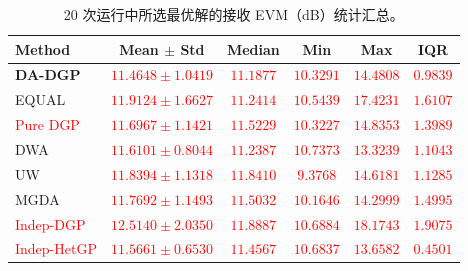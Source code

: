 \documentclass[11pt]{article}
\begin{document}
\begin{table}[!htbp]
	\centering
	\caption{Statistical summary of received EVM for the selected optimal solutions over 20 runs (dB).}
	\caption*{20 次运行中所选最优解的接收 EVM（dB）统计汇总。}
	\label{tab:evm_stats}
	\small
	\begin{tabular*}{\textwidth}{@{\extracolsep{\fill}}lccccc}
		\toprule
		\textbf{Method} & \textbf{Mean $\pm$ Std} & \textbf{Median} & \textbf{Min} & \textbf{Max} & \textbf{IQR} \\
		\midrule
		\textbf{DA-DGP}        & \textcolor{red}{$\mathbf{11.4648 \pm 1.0419}$}%
		                       & \textcolor{red}{$11.1877$} & \textcolor{red}{$10.3291$} & \textcolor{red}{$14.4808$} & \textcolor{red}{$0.9839$} \\
		EQUAL                  & \textcolor{red}{$11.9124 \pm 1.6627$}%
		                       & \textcolor{red}{$11.2414$} & \textcolor{red}{$10.5439$} & \textcolor{red}{$17.4231$} & \textcolor{red}{$1.6107$} \\
		\textcolor{red}{Pure DGP}%
		                       & \textcolor{red}{$11.6967 \pm 1.1421$}%
		                       & \textcolor{red}{$11.5229$} & \textcolor{red}{$10.3227$} & \textcolor{red}{$14.8353$} & \textcolor{red}{$1.3989$} \\
		DWA                    & \textcolor{red}{$11.6101 \pm 0.8044$}%
		                       & \textcolor{red}{$11.2387$} & \textcolor{red}{$10.7373$} & \textcolor{red}{$13.3239$} & \textcolor{red}{$1.1043$} \\
		UW                     & \textcolor{red}{$11.8394 \pm 1.1318$}%
		                       & \textcolor{red}{$11.8410$} & \textcolor{red}{$9.3768$} & \textcolor{red}{$14.6181$} & \textcolor{red}{$1.1285$} \\
		MGDA                   & \textcolor{red}{$11.7692 \pm 1.1493$}%
		                       & \textcolor{red}{$11.5032$} & \textcolor{red}{$10.1646$} & \textcolor{red}{$14.2999$} & \textcolor{red}{$1.4995$} \\
		\textcolor{red}{Indep-DGP}%
		                       & \textcolor{red}{$12.5140 \pm 2.0350$}%
		                       & \textcolor{red}{$11.8887$} & \textcolor{red}{$10.6884$} & \textcolor{red}{$18.1743$} & \textcolor{red}{$1.9075$} \\
		\textcolor{red}{Indep-HetGP}%
		                       & \textcolor{red}{$11.5661 \pm 0.6530$}%
		                       & \textcolor{red}{$11.4567$} & \textcolor{red}{$10.6837$} & \textcolor{red}{$13.6582$} & \textcolor{red}{$0.4501$} \\

\end{tabular*}
\end{table}
\end{document}
